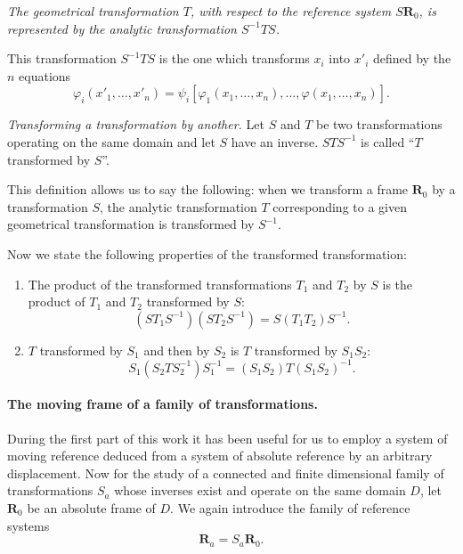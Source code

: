 \documentclass[leqno,11pt]{book}
\makeatletter
\numberwithin{equation}{chapter}
\theoremstyle{shape1}
\theoremstyle{shapesmall}
\let\old@phi\phi
\let\old@varphi\varphi
\let\phi\old@varphi
\let\varphi\old@phi
\newcommand{\somespace}{\vspace{9pt}}
\makeatother
\begin{document}
\somespace

\emph{The geometrical transformation $T$, with respect to the reference system $S\mathbf{R}_{0}$, is represented by the analytic transformation $S^{-1}TS$.}

\somespace

This transformation $S^{-1}TS$ is the one which transforms $x_{i}$ into $x'_{i}$ defined by the $n$ equations
\begin{equation}
  \label{eq:5.3}
  \phi_{i}(x'_{1},\dots,x'_{n})=\psi_{i}[\phi_{1}(x_{1},\dots,x_{n}),\dots,\phi(x_{1},\dots,x_{n})].
\end{equation}

\somespace

\emph{Transforming a transformation by another.} Let $S$ and $T$ be two transformations operating on the same domain and let $S$ have an inverse. $STS^{-1}$ is called ``$T$ transformed by $S$''.

This definition allows us to say the following: when we transform a frame $\mathbf{R}_{0}$ by a transformation $S$, the analytic transformation $T$ corresponding to a given geometrical transformation is transformed by $S^{-1}$.

Now we state the following properties of the transformed transformation:
\begin{enumerate}[\itshape a.]
\item The product of the transformed transformations $T_{1}$ and $T_{2}$ by $S$ is the product of $T_{1}$ and $T_{2}$ transformed by $S$:
\[
(ST_{1}S^{-1})(ST_{2}S^{-1})=S(T_{1}T_{2})S^{-1}.
\]
\item $T$ transformed by $S_{1}$ and then by $S_{2}$ is $T$ transformed by $S_{1}S_{2}$:
\[
S_{1}(S_{2}TS_{2}^{-1})S_{1}^{-1}=(S_{1}S_{2})T(S_{1}S_{2})^{-1}.
\]
\end{enumerate}

\paragraph{The moving frame of a family of transformations.}
\label{sec:63}
During the first part of this work it has been useful for us to employ a system of moving reference deduced from a system of absolute reference by an arbitrary displacement. Now for the study of a connected and finite dimensional family of transformations $S_{a}$ whose inverses exist and operate on the same domain $D$, let $\mathbf{R}_{0}$ be an absolute frame of $D$. We again introduce the family of reference systems
\[
\mathbf{R}_{a}=S_{a}\mathbf{R}_{0}.
\]
\end{document}
